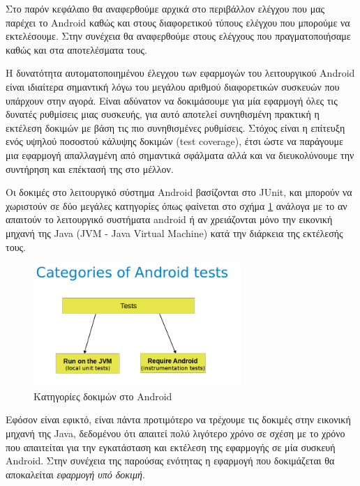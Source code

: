 	Στο παρόν κεφάλαιο θα αναφερθούμε αρχικά στο περιβάλλον ελέγχου που μας παρέχει το Android καθώς και στους διαφορετικού τύπους ελέγχου που μπορούμε να εκτελέσουμε. Στην συνέχεια θα αναφερθούμε στους ελέγχους που πραγματοποιήσαμε καθώς και στα αποτελέσματα τους.
	
	Η δυνατότητα αυτοματοποιημένου έλεγχου των εφαρμογών του λειτουργικού Android είναι ιδιαίτερα σημαντική λόγω του μεγάλου αριθμού διαφορετικών συσκευών που υπάρχουν στην αγορά. Είναι αδύνατον να δοκιμάσουμε για μία εφαρμογή όλες τις δυνατές ρυθμίσεις μιας συσκευής, για αυτό αποτελεί συνηθισμένη πρακτική η εκτέλεση δοκιμών με βάση τις πιο συνηθισμένες ρυθμίσεις. Στόχος είναι η επίτευξη ενός υψηλού ποσοστού κάλυψης δοκιμών (test coverage), έτσι ώστε να παράγουμε μια εφαρμογή απαλλαγμένη από σημαντικά σφάλματα αλλά και να διευκολύνουμε την συντήρηση και επέκτασή της στο μέλλον.
	
	Οι δοκιμές στο λειτουργικό σύστημα Android βασίζονται στο JUnit, και μπορούν να χωριστούν σε δύο μεγάλες κατηγορίες όπως φαίνεται στο σχήμα \ref{fig:categories_of_android_tests} ανάλογα με το αν απαιτούν το λειτουργικό συστήματα android ή αν χρειάζονται μόνο την εικονική μηχανή της Java (JVM - Java Virtual Machine) κατά την διάρκεια της εκτέλεσής τους\cite{androidTesting}.
	
	\begin{figure}[h]
	    \centering
	    \includegraphics[width=0.7\textwidth]{categories_of_android_tests.png}
	    \caption{ Κατηγορίες δοκιμών στο Android}
	    \label{fig:categories_of_android_tests}
	\end{figure}
	
	Εφόσον είναι εφικτό, είναι πάντα προτιμότερο να τρέχουμε τις δοκιμές στην εικονική μηχανή της Java, δεδομένου ότι απαιτεί πολύ λιγότερο χρόνο σε σχέση με το χρόνο που απαιτείται για την εγκατάσταση και εκτέλεση της εφαρμογής σε μία συσκευή Android. Στην συνέχεια της παρούσας ενότητας η εφαρμογή που δοκιμάζεται θα αποκαλείται \textit{εφαρμογή υπό δοκιμή}.
	
